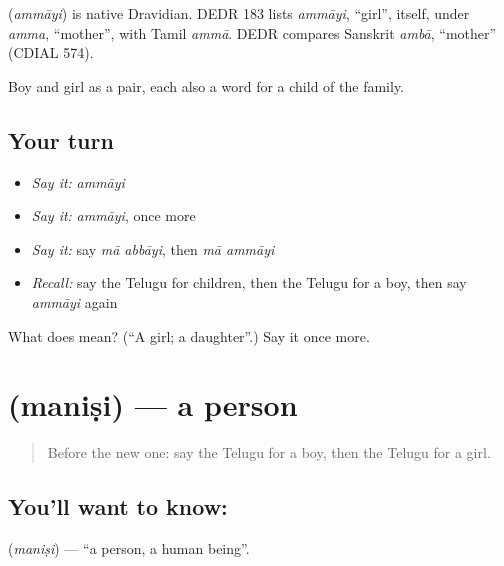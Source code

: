 \begin{cousinweb}
\textbf{} (\emph{ammāyi}) is native Dravidian. DEDR 183 lists \emph{ammāyi}, \textquotedblleft{}girl\textquotedblright{}, itself, under \emph{amma}, \textquotedblleft{}mother\textquotedblright{}, with Tamil \emph{ammā}. DEDR compares Sanskrit \emph{ambā}, \textquotedblleft{}mother\textquotedblright{} (CDIAL 574).
\end{cousinweb}

\begin{grammarlens}[title={What you've built}]
Boy and girl as a pair, each also a word for a child of the family.
\end{grammarlens}

\subsection*{Your turn}
\begin{itemize}
\raggedright
  \item \emph{Say it:} \emph{ammāyi}
  \item \emph{Say it:} \emph{ammāyi}, once more
  \item \emph{Say it:} say \emph{mā abbāyi}, then \emph{mā ammāyi}
  \item \emph{Recall:} say the Telugu for children, then the Telugu for a boy, then say \emph{ammāyi} again
\end{itemize}

\begin{tcolorbox}[breakable,colback=teal!4,colframe=teal!35!black,title={Before you move on}]
What does  mean? (\textquotedblleft{}A girl; a daughter\textquotedblright{}.) Say it once more.
\end{tcolorbox}
\section[\texorpdfstring{\te{మనిషి} (maniṣi)}{మనిషి (maniṣi)}]{ (maniṣi) — a person}

\label{lesson:TE-C88-person}



\begin{quote}
Before the new one: say the Telugu for a boy, then the Telugu for a girl.
\end{quote}

\subsection*{You'll want to know: }
\textbf{} (\emph{maniṣi}) — \textquotedblleft{}a person, a human being\textquotedblright{}.

